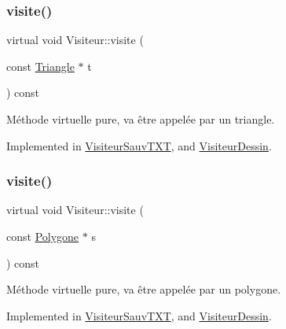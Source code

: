 \subsubsection{\texorpdfstring{visite()}{visite()}\hspace{0.1cm}{\footnotesize\ttfamily [3/5]}}
{\footnotesize\ttfamily virtual void Visiteur\+::visite (\begin{DoxyParamCaption}\item[{const \hyperlink{class_triangle}{Triangle} $\ast$}]{t }\end{DoxyParamCaption}) const\hspace{0.3cm}{\ttfamily [pure virtual]}}



Méthode virtuelle pure, va être appelée par un triangle. 



Implemented in \hyperlink{class_visiteur_sauv_t_x_t_a85ef6d5cdd09ae497ad6a2e4ce72a482}{Visiteur\+Sauv\+T\+XT}, and \hyperlink{class_visiteur_dessin_a8278a3991c52c9d00e5ad5a051faacfe}{Visiteur\+Dessin}.

\mbox{\label{class_visiteur_a0a7c596d84a8750e3a670330a1001538}} 
\subsubsection{\texorpdfstring{visite()}{visite()}\hspace{0.1cm}{\footnotesize\ttfamily [4/5]}}
{\footnotesize\ttfamily virtual void Visiteur\+::visite (\begin{DoxyParamCaption}\item[{const \hyperlink{class_polygone}{Polygone} $\ast$}]{s }\end{DoxyParamCaption}) const\hspace{0.3cm}{\ttfamily [pure virtual]}}



Méthode virtuelle pure, va être appelée par un polygone. 



Implemented in \hyperlink{class_visiteur_sauv_t_x_t_abaf3f953e31644d64110e156bac9c020}{Visiteur\+Sauv\+T\+XT}, and \hyperlink{class_visiteur_dessin_a59ef1f9a400906300fa4e6d3c1ec0ea1}{Visiteur\+Dessin}.

\mbox{\label{class_visiteur_a812aa03fad51d8aec386f8df7f9b5353}} 
